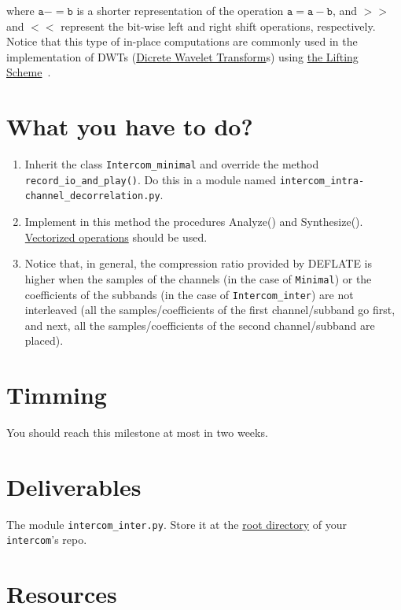 where $\mathtt{a -= b}$ is a shorter representation of the operation
$\mathtt{a = a - b}$, and $\mathtt{>>}$ and $\mathtt{<<}$ represent
the bit-wise left and right shift operations, respectively. Notice
that this type of in-place computations are commonly used in the
implementation of DWTs
(\href{https://en.wikipedia.org/wiki/Discrete_wavelet_transform}{Dicrete
  Wavelet Transform}s) using
\href{https://cm-bell-labs.github.io/who/wim/papers/athome/athome.pdf}{the
  Lifting Scheme}~\cite{2006.sweldens}.

\section{What you have to do?}

\begin{enumerate}
\item Inherit the class \texttt{Intercom\_minimal} and override the
  method \texttt{record\_io\_and\_play()}. Do this in a module named
  \texttt{intercom\_intra-channel\_decorrelation.py}.
\item Implement in this method the procedures Analyze() and
  Synthesize(). \href{https://www.oreilly.com/library/view/python-for-data/9781449323592/ch04.html}{Vectorized
    operations} should be used.
\item Notice that, in general, the compression ratio provided by
  DEFLATE is higher when the samples of the channels (in the case of
  \texttt{Minimal}) or the coefficients of the subbands (in
  the case of \texttt{Intercom\_inter}) are not interleaved (all the
  samples/coefficients of the first channel/subband go first, and
  next, all the samples/coefficients of the second channel/subband are
  placed).
\end{enumerate}

\section{Timming}

You should reach this milestone at most in two weeks.

\section{Deliverables}

The module \texttt{intercom\_inter.py}. Store
it at the
\href{https://github.com/Tecnologias-multimedia/intercom}{root
  directory} of your \texttt{intercom}'s repo.

\section{Resources}



